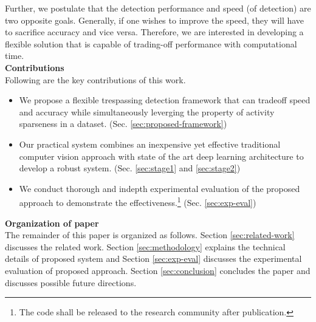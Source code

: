 Further, we postulate that the detection performance and speed (of detection) are two opposite goals. Generally, if one wishes to improve the speed, they will have to sacrifice accuracy and vice versa. Therefore, we are interested in developing a  flexible solution that is capable of trading-off performance with computational time.
\\ \textbf{Contributions} \\
Following are the key contributions of this work. 
\begin{itemize}
\item We propose a flexible trespassing detection framework that can tradeoff speed and accuracy while simultaneously leverging the property of activity sparseness in a dataset. (Sec. \ref{sec:proposed-framework})

\item Our practical system combines an inexpensive yet effective traditional computer vision approach with state of the art deep learning architecture to develop a robust system. (Sec. \ref{sec:stage1} and \ref{sec:stage2})

\item We conduct thorough and indepth experimental evaluation of the proposed approach to demonstrate the effectiveness.\footnote{The code shall be released to the research community after publication.} (Sec. \ref{sec:exp-eval})
\end{itemize}
\textbf{Organization of paper} \\
The remainder of this paper is organized as follows.  Section \ref{sec:related-work} discusses the related work. Section \ref{sec:methodology} explains the technical details of proposed system and Section \ref{sec:exp-eval} discusses the experimental evaluation of proposed approach. Section \ref{sec:conclusion} concludes the paper and discusses possible future directions. 